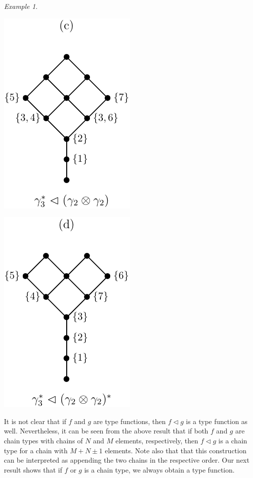 \documentclass[12pt]{article}
\theoremstyle{definition}
\theoremstyle{remark}
\newtheorem{exm}{Example}
\def\vtl{\vartriangleleft}
\begin{document}
\begin{exm}
\begin{center}
\begin{minipage}[c]{0.2\textwidth}
\centering
\includegraphics[scale=0.7]{vtl_c.pdf}
\end{minipage}
\begin{minipage}[c]{0.2\textwidth}
\centering
\includegraphics[scale=0.7]{vtl_d.pdf}
\end{minipage}
\end{center}



\end{exm}





It is not clear that if $f$ and $g$ are type functions, then $f\vtl g$ is a type function as well. 
Nevertheless, it can be seen from the above result
that if both $f$ and $g$ are chain types with chains of $N$ and $M$ elements,
respectively, then $f\vtl g$ is a chain type for a chain with $M+N\pm 1$
elements. Note also that that this construction can be
interpreted as appending the two chains in the respective order. 
Our next result shows that if $f$ or $g$ is a chain type, we always obtain a type
function.
\end{document}
